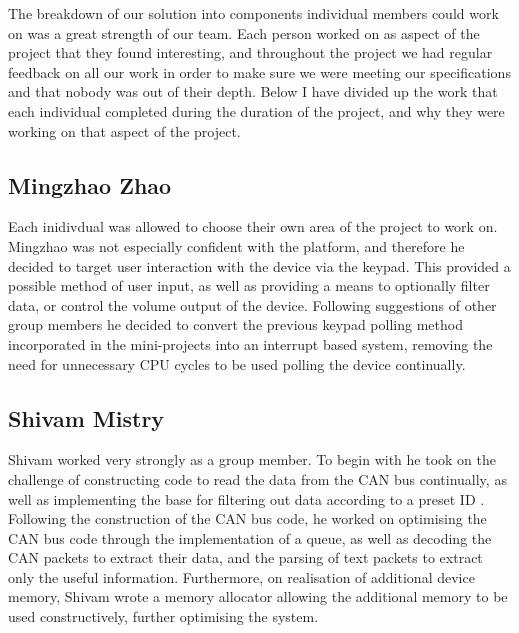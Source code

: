 The breakdown of our solution into components individual members could work on 
was a great strength of our team. Each person worked on as aspect of the project 
that they found interesting, and throughout the project we had regular feedback 
on all our work in order to make sure we were meeting our specifications and 
that nobody was out of their depth. Below I have divided up the work that each 
individual completed during the duration of the project, and why they were 
working on that aspect of the project. 

\subsection*{Mingzhao Zhao}
Each inidivdual was allowed to choose their own area of the project to work on. 
Mingzhao was not especially confident with the platform, and therefore he 
decided to target user interaction with the device via the keypad. This 
provided a possible method of user input, as well as providing a means to 
optionally filter data, or control the volume output of the device. 
Following suggestions 
of other group members he decided to convert the previous keypad polling method 
incorporated in the mini-projects into an interrupt based system, removing the 
need for unnecessary CPU cycles to be used polling the device continually. 

\subsection*{Shivam Mistry} 
Shivam worked very strongly as a group member. To begin with he took on the 
challenge of constructing code to read the data from the CAN bus continually, 
as well as implementing the base for filtering out data according to a preset ID
. Following the construction of the CAN bus code, he worked on optimising the 
CAN bus code through the
implementation of a queue, as well as decoding the CAN packets to extract their
data, and the parsing of text packets to extract only the useful information. 
Furthermore, on realisation of additional device memory, Shivam wrote a memory 
allocator allowing the additional memory to be used constructively, further 
optimising the system. 

